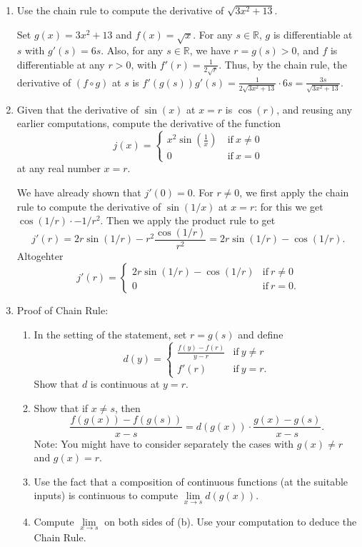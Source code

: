 \documentclass[12pt]{amsart}
\def\ds{\displaystyle}
\newcommand{\R}{{\mathbb{R}}}
\numberwithin{equation}{section}
\theoremstyle{plain} %
\theoremstyle{definition}
\theoremstyle{remark}
\begin{document}
\begin{enumerate}
\item Use the chain rule to compute the derivative of $\sqrt{3x^2 + 13}$.

\begin{framed}
Set $g(x)= 3x^2+13$ and $f(x)=\sqrt{x}$. For any $s\in\R$, $g$ is differentiable at $s$ with $g'(s)=6s$. Also, for any $s\in \R$, we have $r=g(s) >0$, and $f$ is differentiable at any $r>0$, with $f'(r)=\frac{1}{2\sqrt{r}}$. Thus, by the chain rule, the derivative of $(f\circ g)$ at $s$ is $f'(g(s)) g'(s) = \frac{1}{2\sqrt{3x^2 + 13}} \cdot 6s = \frac{3s}{\sqrt{3x^2+13}}$.
\end{framed}

\item Given that the derivative of $\sin(x)$ at $x=r$ is $\cos(r)$, and reusing any earlier computations, compute the derivative of the function
\[ j(x) = \begin{cases} x^2 \sin(\frac{1}{x}) & \ \text{if} \ x\neq 0 \\
0 & \ \text{if} \ x= 0 \end{cases}\]
at any real number $x=r$.

\begin{framed}
We have already shown that $j'(0)=0$. For $r\neq 0$, we first apply the chain rule to compute the derivative of $\sin(1/x)$ at $x=r$: for this we get $\cos(1/r) \cdot -1/r^2$. Then we apply the product rule to get \[j'(r)= 2r \sin(1/r) - r^2 \frac{\cos(1/r)}{r^2} = 2r \sin(1/r) - \cos(1/r).\] Altogehter
\[ j'(r) = \begin{cases} 2r \sin(1/r) - \cos(1/r) & \text{if} \ r\neq 0 \\ 0 & \text{if} \  r=0.\end{cases}\]
\end{framed}


\item Proof of Chain Rule:

\begin{enumerate}
\item In the setting of the statement, set $r=g(s)$ and define
\[ d(y) = \begin{cases} \ds \frac{f(y) - f(r)}{y-r} & \text{if} \ y\neq r \\ f'(r) & \text{if} \ y=r.\end{cases}\]
Show that $d$ is continuous at $y=r$.
\item Show that if $x\neq s$, then
\[ \frac{f(g(x)) - f(g(s))}{x-s} = d(g(x)) \cdot \frac{g(x)-g(s)}{x-s}.\]
Note: You might have to consider separately the cases with $g(x)\neq r$ and $g(x)=r$.
\item Use the fact that a composition of continuous functions (at the suitable inputs) is continuous to compute $\lim\limits_{x\to s} d(g(x))$.
\item Compute $\lim\limits_{x\to s}$ on both sides of (b). Use your computation to deduce the Chain Rule.
\end{enumerate}


\end{enumerate}
\end{document}
